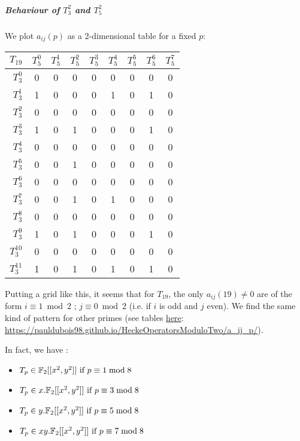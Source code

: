 \subparagraph{Behaviour of $T_3^2$ and $T_5^2$}
We plot $a_{ij}(p)$ as a 2-dimensional table for a fixed $p$:
\begin{center}
	\begin{tabular}{|r||cc|cc|cc|cc|}
		\hline
		\textbf{$ T_{19}$} & \textbf{$ T_5^{0} $} & \textbf{$ T_5^{1} $} & \textbf{$ T_5^{2} $} & \textbf{$ T_5^{3} $} & \textbf{$ T_5^{4} $} & \textbf{$ T_5^{5} $} & \textbf{$ T_5^{6} $} & \textbf{$ T_5^{7} $} \\
		\hline\hline
		$ T_3^{0} $ & 0 & 0 & 0 & 0 & 0 & 0 & 0 & 0 \\
		$ T_3^{1} $ & 1 & 0 & 0 & 0 & 1 & 0 & 1 & 0 \\
		\hline
		$ T_3^{2} $ & 0 & 0 & 0 & 0 & 0 & 0 & 0 & 0 \\
		$ T_3^{3} $ & 1 & 0 & 1 & 0 & 0 & 0 & 1 & 0 \\
		\hline
		$ T_3^{4} $ & 0 & 0 & 0 & 0 & 0 & 0 & 0 & 0 \\
		$ T_3^{5} $ & 0 & 0 & 1 & 0 & 0 & 0 & 0 & 0 \\
		\hline
		$ T_3^{6} $ & 0 & 0 & 0 & 0 & 0 & 0 & 0 & 0 \\
		$ T_3^{7} $ & 0 & 0 & 1 & 0 & 1 & 0 & 0 & 0 \\
		\hline
		$ T_3^{8} $ & 0 & 0 & 0 & 0 & 0 & 0 & 0 & 0 \\
		$ T_3^{9} $ & 1 & 0 & 1 & 0 & 0 & 0 & 1 & 0 \\
		\hline
		$ T_3^{10} $ & 0 & 0 & 0 & 0 & 0 & 0 & 0 & 0 \\
		$ T_3^{11} $ & 1 & 0 & 1 & 0 & 1 & 0 & 1 & 0 \\
		\hline
	\end{tabular}
\end{center}

Putting a grid like this, it seems that for $T_{19}$, the only $a_{ij}(19) \neq 0$ are of the form $i \equiv 1 \bmod 2\text{ ; } j \equiv 0 \bmod 2$ (i.e. if $i$ is odd and $j$ even).
We find the same kind of pattern for other primes (see tables \href{https://pauldubois98.github.io/HeckeOperatorsModuloTwo/a_ij_p/}{here}: \url{https://pauldubois98.github.io/HeckeOperatorsModuloTwo/a_ij_p/}).

In fact, we have \cite[§7]{StructureAlgebreHecke}:
\begin{itemize}
	\item $T_p \in \mathbb{F}_2[[x^2, y^2]] \text{ if } p \equiv 1 \bmod 8$
	\item $T_p \in x.\mathbb{F}_2[[x^2, y^2]] \text{ if } p \equiv 3 \bmod 8$
	\item $T_p \in y.\mathbb{F}_2[[x^2, y^2]] \text{ if } p \equiv 5 \bmod 8$
	\item $T_p \in xy.\mathbb{F}_2[[x^2, y^2]] \text{ if } p \equiv 7 \bmod 8$
\end{itemize}

